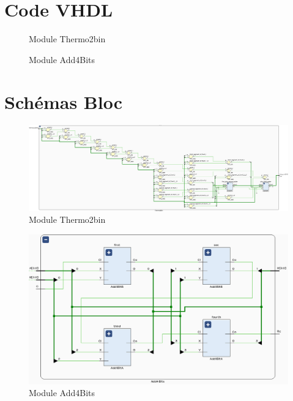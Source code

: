 \section{Code VHDL}

\begin{figure}[H]
	\tiny
	\centering
	\begin{varwidth}{\linewidth}
		
	\end{varwidth}
	\caption{Module Thermo2bin}
\end{figure}

\begin{figure}[H]
	\tiny
	\centering
	\begin{varwidth}{\linewidth}
		
	\end{varwidth}
	\caption{Module Add4Bits}
\end{figure}

\section{Schémas Bloc}

\begin{figure}[H]
	\centering
	\includegraphics[width=\textwidth]{assets/img/schematic-thermo2bin.png}
	\caption{Module Thermo2bin}
\end{figure}

\begin{figure}[H]
	\centering
	\includegraphics[width=.6\textwidth]{assets/img/schematic-add4bits.png}
	\caption{Module Add4Bits}
\end{figure}

